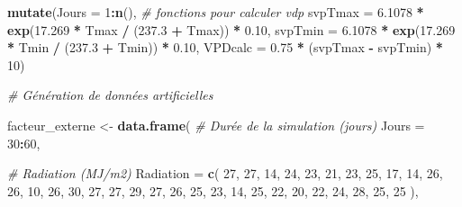 \documentclass[
]{article}
\newenvironment{Shaded}{\begin{snugshade}}{\end{snugshade}}
\newcommand{\AttributeTok}[1]{\textcolor[rgb]{0.13,0.29,0.53}{#1}}
\newcommand{\CommentTok}[1]{\textcolor[rgb]{0.56,0.35,0.01}{\textit{#1}}}
\newcommand{\DecValTok}[1]{\textcolor[rgb]{0.00,0.00,0.81}{#1}}
\newcommand{\FloatTok}[1]{\textcolor[rgb]{0.00,0.00,0.81}{#1}}
\newcommand{\FunctionTok}[1]{\textcolor[rgb]{0.13,0.29,0.53}{\textbf{#1}}}
\newcommand{\NormalTok}[1]{#1}
\newcommand{\OtherTok}[1]{\textcolor[rgb]{0.56,0.35,0.01}{#1}}
\newcommand{\SpecialCharTok}[1]{\textcolor[rgb]{0.81,0.36,0.00}{\textbf{#1}}}
\begin{document}
\begin{Shaded}
\begin{Highlighting}[]
  \FunctionTok{mutate}\NormalTok{(}\AttributeTok{Jours =} \DecValTok{1}\SpecialCharTok{:}\FunctionTok{n}\NormalTok{(),  }\CommentTok{\# fonctions pour calculer vdp                                    }
         \AttributeTok{svpTmax =} \FloatTok{6.1078} \SpecialCharTok{*} \FunctionTok{exp}\NormalTok{(}\FloatTok{17.269} \SpecialCharTok{*}\NormalTok{ Tmax }\SpecialCharTok{/}\NormalTok{ (}\FloatTok{237.3} \SpecialCharTok{+}\NormalTok{ Tmax)) }\SpecialCharTok{*} \FloatTok{0.10}\NormalTok{,}
         \AttributeTok{svpTmin =} \FloatTok{6.1078} \SpecialCharTok{*} \FunctionTok{exp}\NormalTok{(}\FloatTok{17.269} \SpecialCharTok{*}\NormalTok{ Tmin }\SpecialCharTok{/}\NormalTok{ (}\FloatTok{237.3} \SpecialCharTok{+}\NormalTok{ Tmin)) }\SpecialCharTok{*} \FloatTok{0.10}\NormalTok{,}
         \AttributeTok{VPDcalc =} \FloatTok{0.75} \SpecialCharTok{*}\NormalTok{ (svpTmax }\SpecialCharTok{{-}}\NormalTok{ svpTmin) }\SpecialCharTok{*} \DecValTok{10}\NormalTok{)}

\CommentTok{\# Génération de données artificielles}

\NormalTok{facteur\_externe }\OtherTok{\textless{}{-}} \FunctionTok{data.frame}\NormalTok{(}
  \CommentTok{\# Durée de la simulation (jours)}
  \AttributeTok{Jours =} \DecValTok{30}\SpecialCharTok{:}\DecValTok{60}\NormalTok{, }
  
  \CommentTok{\# Radiation (MJ/m2)}
  \AttributeTok{Radiation =} \FunctionTok{c}\NormalTok{( }
    \DecValTok{27}\NormalTok{, }\DecValTok{27}\NormalTok{, }\DecValTok{14}\NormalTok{, }\DecValTok{24}\NormalTok{, }\DecValTok{23}\NormalTok{, }\DecValTok{21}\NormalTok{, }
    \DecValTok{23}\NormalTok{, }\DecValTok{25}\NormalTok{, }\DecValTok{17}\NormalTok{, }\DecValTok{14}\NormalTok{, }\DecValTok{26}\NormalTok{, }\DecValTok{26}\NormalTok{, }
    \DecValTok{10}\NormalTok{, }\DecValTok{26}\NormalTok{, }\DecValTok{30}\NormalTok{, }\DecValTok{27}\NormalTok{, }\DecValTok{27}\NormalTok{, }\DecValTok{29}\NormalTok{, }
    \DecValTok{27}\NormalTok{, }\DecValTok{26}\NormalTok{, }\DecValTok{25}\NormalTok{, }\DecValTok{23}\NormalTok{, }\DecValTok{14}\NormalTok{, }\DecValTok{25}\NormalTok{, }
    \DecValTok{22}\NormalTok{, }\DecValTok{20}\NormalTok{, }\DecValTok{22}\NormalTok{, }\DecValTok{24}\NormalTok{, }\DecValTok{28}\NormalTok{, }\DecValTok{25}\NormalTok{, }\DecValTok{25}
\NormalTok{  ),}
  

\end{Highlighting}
\end{Shaded}
\end{document}
